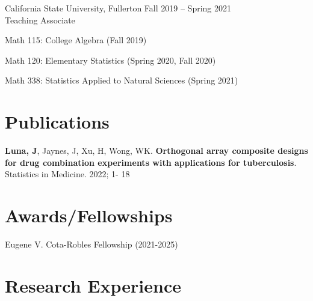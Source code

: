 \documentclass[margin,line]{res}
\newenvironment{list1}{
  \begin{list}{\ding{113}}{
      \setlength{\itemsep}{0in}
      \setlength{\parsep}{0in} \setlength{\parskip}{0in}
      \setlength{\topsep}{0in} \setlength{\partopsep}{0in} 
      \setlength{\leftmargin}{0.20in}}}{\end{list}}
\begin{document}
\begin{resume}
{\sc California State University, Fullerton} \hfill{Fall 2019 -- Spring 2021} \\ Teaching Associate\\[-0.3cm]
\begin{list1}
	\item[] Math 115: College Algebra \hspace{1ex} (Fall 2019)
	\item[] Math 120: Elementary Statistics  \hspace{1ex} (Spring 2020, Fall 2020)
	\item[] Math 338: Statistics Applied to Natural Sciences  \hspace{1ex} (Spring 2021)
\end{list1}

\vspace{1ex}

\section{\sc Publications}
\begin{list1}
\item[] \textbf{Luna, J}, Jaynes, J, Xu, H, Wong, WK. \textbf{Orthogonal array composite designs for drug combination experiments with applications for tuberculosis}. Statistics in Medicine. 2022; 1- 18
\end{list1}

\vspace{2ex}

\section{\sc Awards/\newline Fellowships}
\begin{list1}
\item[] Eugene V. Cota-Robles Fellowship (2021-2025)
\end{list1}




\vspace{2ex}

\section{\sc Research Experience}



\end{resume}
\end{document}
